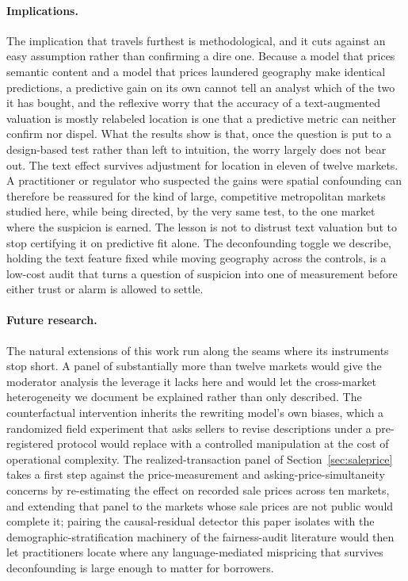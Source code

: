 \paragraph{Implications.} The implication that travels furthest is
methodological, and it cuts against an easy assumption rather than confirming a
dire one. Because a model that prices semantic content and a model that
prices laundered geography make identical predictions, a predictive gain on its
own cannot tell an analyst which of the two it has bought, and the reflexive worry
that the accuracy of a text-augmented valuation is mostly relabeled location is
one that a predictive metric can neither confirm nor dispel. What the results show
is that, once the question is put to a design-based test rather than left to
intuition, the worry largely does not bear out. The text effect survives
adjustment for location in eleven of twelve markets. A practitioner or
regulator who suspected the gains were spatial confounding can therefore be
reassured for the kind of large, competitive metropolitan markets studied here,
while being directed, by the very same test, to the one market where the suspicion
is earned. The lesson is not to distrust text
valuation but to stop certifying it on predictive fit alone. The
deconfounding toggle we describe, holding the text feature fixed while moving
geography across the controls, is a low-cost audit that turns a question of
suspicion into one of measurement before either trust or alarm is allowed to
settle.

\paragraph{Future research.} The natural extensions of this work run along the
seams where its instruments stop short. A panel of substantially
more than twelve markets would give the moderator analysis the leverage it lacks
here and would let the cross-market heterogeneity we document be explained rather
than only described. The counterfactual intervention inherits the rewriting
model's own biases, which a randomized field experiment that asks sellers to
revise descriptions under a pre-registered protocol would replace with a controlled
manipulation at the cost of operational complexity. The realized-transaction panel
of Section~\ref{sec:saleprice} takes a first step against the price-measurement and
asking-price-simultaneity concerns by re-estimating the effect on recorded sale
prices across ten markets, and extending that panel to the markets whose sale
prices are not public would complete it; pairing the causal-residual detector this
paper isolates with the demographic-stratification machinery of the fairness-audit
literature would then let practitioners locate where any language-mediated
mispricing that survives deconfounding is large enough to matter for borrowers.
